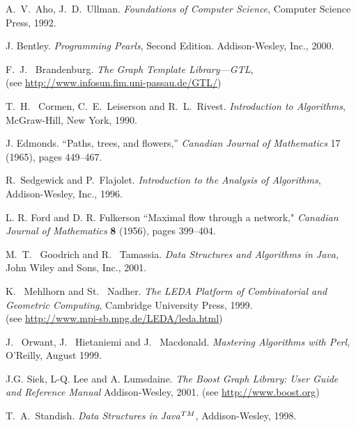 
\begin{thebibliography}{9}

   A.~V.~Aho, J.~D.~Ullman. \emph{Foundations of Computer Science}, 
Computer Science Press, 1992.

J. Bentley. \emph{Programming Pearls}, Second Edition. 
Addison-Wesley, Inc., 2000.

F.~J.~ Brandenburg. \emph{The Graph Template Library---GTL},\\ 
(see \url{http://www.infosun.fim.uni-passau.de/GTL/})

T.~H.~ Cormen, C.~E.~Leiserson and R.~L.~Rivest.
      \emph{Introduction to Algorithms}, McGraw-Hill, New York, 1990. 

J. Edmonds.
``Paths, trees, and flowers,''
\emph{Canadian Journal of Mathematics} 17 (1965), pages 449--467. 

R.~Sedgewick and P.~Flajolet.
\emph{Introduction to the Analysis of Algorithms}, Addison-Wesley, Inc., 1996.

L. R. Ford and D. R. Fulkerson 
``Maximal flow through a network,"
\textit{Canadian Journal of Mathematics} \textbf{8} (1956), pages
399--404.

M.~T.~ Goodrich and R.~ Tamassia. 
       \emph{Data Structures and Algorithms in Java}, 
       John Wiley and Sons, Inc., 2001.

K.~ Mehlhorn and St.~ Nadher.
   \emph{The LEDA Platform of Combinatorial and Geometric Computing},
   Cambridge University Press, 1999. \\
   (see \url{http://www.mpi-sb.mpg.de/LEDA/leda.html})

   J.~ Orwant, J.~ Hietaniemi and J.~ Macdonald.
    \emph{Mastering Algorithms with Perl}, O'Reilly, August 1999.

    J.G. Siek, L-Q. Lee and A. Lumsdaine.
\emph{The Boost Graph Library: User Guide and Reference Manual}
    Addison-Wesley, 2001. (see \url{http://www.boost.org}) 

   T.~A.~Standish. \emph{Data Structures in Java\(^{\rm TM}\)}, 
                 Addison-Wesley, 1998.

\end{thebibliography} 
